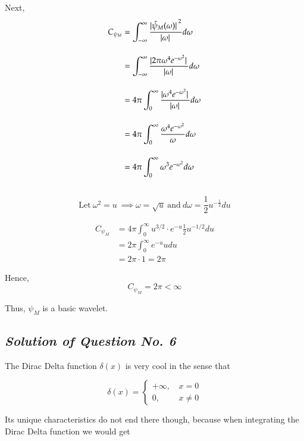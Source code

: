 \documentclass[12pt, a4paper]{article} %
\begin{document}
Next,
\begin{equation*}
    \begin{split}
        C_{\psi_M} & = \int_{-\infty}^{\infty}\frac{\abs*{\hat{\psi}_M(\omega)}^2}{\abs*{\omega}}d\omega\\[4mm]
        & = \int_{-\infty}^{\infty}\frac{\abs*{2\pi \omega^4 e^{-\omega^2}}}{\abs*{\omega}}d\omega\\[4mm]
        & = 4\pi\int_{0}^{\infty}\frac{\abs*{\omega^4 e^{-\omega^2}}}{\abs*{\omega}}d\omega\\[4mm]
        & =  4\pi\int_{0}^{\infty}\frac{\omega^4 e^{-\omega^2}}{\omega}d\omega\\[4mm]
        & =  4\pi\int_{0}^{\infty}\omega^3 e^{-\omega^2}d\omega\\[4mm]
    \end{split}
\end{equation*}

\[\boxed{\mbox{Let}\ \omega^2 = u \ \implies \omega = \sqrt{u}\ \mbox{and}\ d\omega = \frac{1}{2}u^{-\frac{1}{2}}du}\]

\begin{equation*}
    \begin{split}
        C_{\psi_M} & = 4\pi\int_{0}^{\infty}u^{3/2}\cdot e^{-u}\frac{1}{2}u^{-1/2}du\\[4mm]
        & = 2\pi \int_{0}^{\infty} e^{-u} u du\\[4mm]
        & = 2\pi\cdot 1 = 2\pi
    \end{split}
\end{equation*}

Hence,
\[\boxed{C_{\psi_M} = 2\pi < \infty}\]

\begin{center}
    Thus, $\psi_M$ is a basic wavelet.
\end{center}
\BgThispage
\subsection{\slshape Solution of Question No. 6}

The Dirac Delta function $\delta(x)$ is very cool in the sense that

\[\delta(x) = \begin{cases}
    +\infty, \, & x =0 \\
    0, \, & x \ne 0
    \end{cases}\]

Its unique characteristics do not end there though, because when integrating the Dirac Delta function we would get
\end{document}
